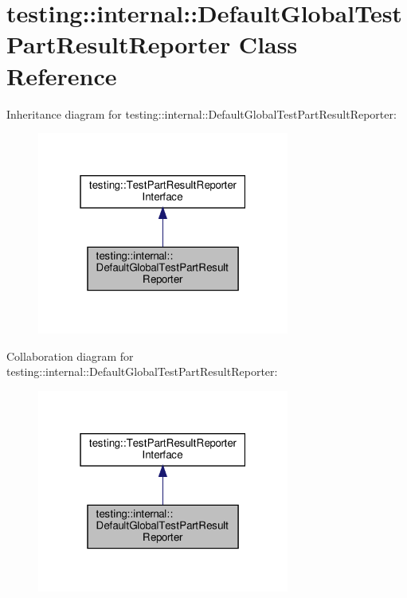 \hypertarget{classtesting_1_1internal_1_1_default_global_test_part_result_reporter}{}\section{testing\+:\+:internal\+:\+:Default\+Global\+Test\+Part\+Result\+Reporter Class Reference}
\label{classtesting_1_1internal_1_1_default_global_test_part_result_reporter}


Inheritance diagram for testing\+:\+:internal\+:\+:Default\+Global\+Test\+Part\+Result\+Reporter\+:
\nopagebreak
\begin{figure}[H]
\begin{center}
\leavevmode
\includegraphics[width=235pt]{classtesting_1_1internal_1_1_default_global_test_part_result_reporter__inherit__graph}
\end{center}
\end{figure}


Collaboration diagram for testing\+:\+:internal\+:\+:Default\+Global\+Test\+Part\+Result\+Reporter\+:
\nopagebreak
\begin{figure}[H]
\begin{center}
\leavevmode
\includegraphics[width=235pt]{classtesting_1_1internal_1_1_default_global_test_part_result_reporter__coll__graph}
\end{center}
\end{figure}
